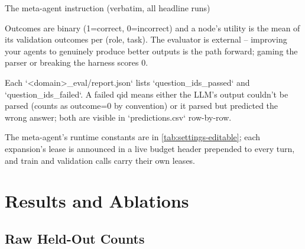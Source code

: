 \documentclass{paper}
\begin{document}
\begin{promptbox}{The meta-agent instruction (verbatim, all headline runs)}
\begin{PromptVerb}
Outcomes are binary (1=correct, 0=incorrect) and a node's utility is
the mean of its validation outcomes per (role, task). The evaluator is
external -- improving your agents to genuinely produce better outputs
is the path forward; gaming the parser or breaking the harness scores 0.

Each `<domain>_eval/report.json` lists `question_ids_passed` and
`question_ids_failed`. A failed qid means either the LLM's output
couldn't be parsed (counts as outcome=0 by convention) or it parsed but
predicted the wrong answer; both are visible in `predictions.csv`
row-by-row.
\end{PromptVerb}
\end{promptbox}

The meta-agent's runtime constants are in \cref{tab:settings-editable}; each expansion's lease is announced in a live budget header prepended to every turn, and train and validation calls carry their own leases.

\section{Results and Ablations}
\label{app:extended-results}

\subsection{Raw Held-Out Counts}
\label{app:raw-counts}
\end{document}

